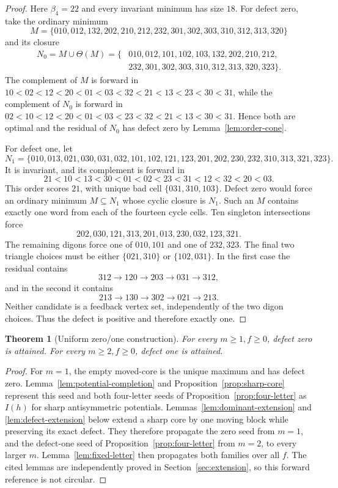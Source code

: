 \documentclass[11pt,a4paper]{article}
\newtheorem{theorem}{Theorem}[section]
\theoremstyle{remark}
\begin{document}
\begin{proof}
Here \(\beta_4=22\) and every invariant minimum has size \(18\).  For defect
zero, take the ordinary minimum
\[
 M=\{010,012,132,202,210,212,232,301,302,303,310,312,313,320\}
\]
and its closure
\[
 \begin{aligned}
 N_0=M\cup\Theta(M)=\{&010,012,101,102,103,132,202,210,212,\\
                       &232,301,302,303,310,312,313,320,323\}.
 \end{aligned}
\]
The complement of \(M\) is forward in
\(10<02<12<20<01<03<32<21<13<23<30<31\), while the complement of
\(N_0\) is forward in
\(02<10<12<20<01<03<23<32<21<13<30<31\).  Hence both are optimal and
the residual of \(N_0\) has defect zero by Lemma~\ref{lem:order-cone}.

For defect one, let
\[
 N_1=\{010,013,021,030,031,032,101,102,121,123,201,202,
 230,232,310,313,321,323\}.
\]
It is invariant, and its complement is forward in
\[
 21<10<13<30<01<02<23<31<12<32<20<03.
\]
This order scores \(21\), with unique bad cell
\(\{031,310,103\}\).  Defect zero would force an ordinary minimum
\(M\subseteq N_1\) whose cyclic closure is \(N_1\).  Such an \(M\) contains
exactly one word from each of the fourteen cycle cells.  Ten singleton
intersections force
\[
 202,030,121,313,201,013,230,032,123,321.
\]
The remaining digons force one of \(010,101\) and one of \(232,323\).
The final two triangle choices must be either \(\{021,310\}\) or
\(\{102,031\}\).  In the first case the residual contains
\[
 312\to120\to203\to031\to312,
\]
and in the second it contains
\[
 213\to130\to302\to021\to213.
\]
Neither candidate is a feedback vertex set, independently of the two digon
choices.  Thus the defect is positive and therefore exactly one.
\end{proof}

\begin{theorem}[Uniform zero/one construction]
\label{thm:zero-one}
For every \(m\geq1,f\geq0\), defect zero is attained.  For every
\(m\geq2,f\geq0\), defect one is attained.
\end{theorem}

\begin{proof}
For \(m=1\), the empty moved-core is the unique maximum and has defect zero.
Lemma~\ref{lem:potential-completion} and
Proposition~\ref{prop:sharp-core} represent this seed and both four-letter
seeds of Proposition~\ref{prop:four-letter} as \(I(h)\) for sharp
antisymmetric potentials.
Lemmas~\ref{lem:dominant-extension} and \ref{lem:defect-extension} below
extend a sharp core by one moving block while preserving its exact defect.
They therefore propagate the zero seed from \(m=1\), and the defect-one seed
of Proposition~\ref{prop:four-letter} from \(m=2\), to every larger \(m\).
Lemma~\ref{lem:fixed-letter} then propagates both families over all \(f\).
The cited lemmas are independently proved in Section~\ref{sec:extension}, so
this forward reference is not circular.
\end{proof}
\end{document}
